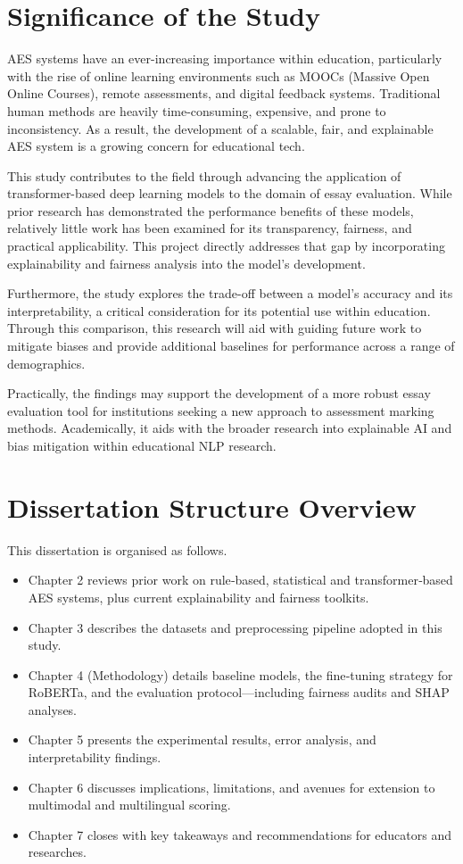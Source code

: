 \documentclass[10pt]{report}
\begin{document}
\section{Significance of the Study}
AES systems have an ever-increasing importance within education, particularly with the rise of online learning environments such as MOOCs (Massive Open Online Courses), remote assessments, and digital feedback systems. Traditional human methods are heavily time-consuming, expensive, and prone to inconsistency. As a result, the development of a scalable, fair, and explainable AES system is a growing concern for educational tech.

This study contributes to the field through advancing the application of transformer-based deep learning models to the domain of essay evaluation. While prior research has demonstrated the performance benefits of these models, relatively little work has been examined for its transparency, fairness, and practical applicability. This project directly addresses that gap by incorporating explainability and fairness analysis into the model’s development.

Furthermore, the study explores the trade-off between a model’s accuracy and its interpretability, a critical consideration for its potential use within education. Through this comparison, this research will aid with guiding future work to mitigate biases and provide additional baselines for performance across a range of demographics.

Practically, the findings may support the development of a more robust essay evaluation tool for institutions seeking a new approach to assessment marking methods. Academically, it aids with the broader research into explainable AI and bias mitigation within educational NLP research.

\section{Dissertation Structure Overview}

This dissertation is organised as follows.
\begin{itemize}
    \item Chapter 2 reviews prior work on rule‑based, statistical and transformer‑based AES systems, plus current explainability and fairness toolkits.
    \item Chapter 3 describes the datasets and preprocessing pipeline adopted in this study.  
    \item Chapter 4 (Methodology) details baseline models, the fine‑tuning strategy for RoBERTa, and the evaluation protocol—including fairness audits and SHAP analyses. 
    \item Chapter 5 presents the experimental results, error analysis, and interpretability findings.  
    \item Chapter 6 discusses implications, limitations, and avenues for extension to multimodal and multilingual scoring.  
    \item Chapter 7 closes with key takeaways and recommendations for educators and researches.
\end{itemize}
\end{document}
